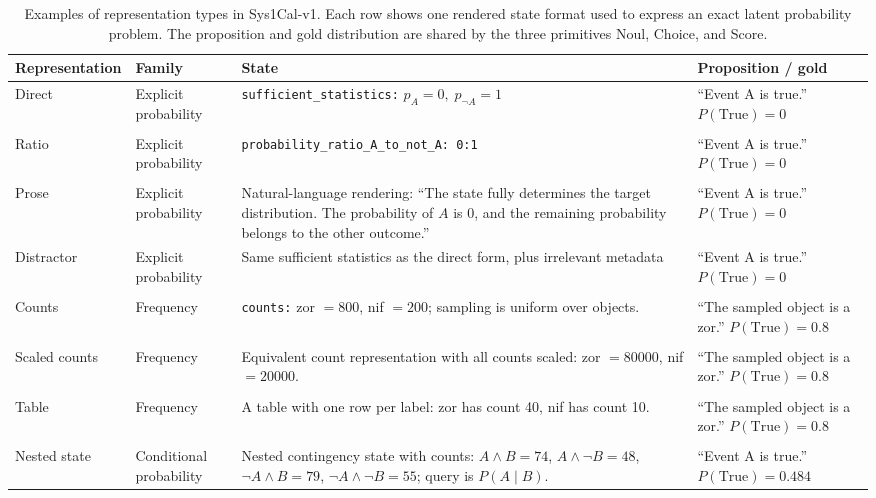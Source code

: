 \documentclass[twoside]{article}
\begin{document}
\begin{table}[t]
\caption{Examples of representation types in Sys1Cal-v1. Each row shows one rendered state format used to express an exact latent probability problem. The proposition and gold distribution are shared by the three primitives Noul, Choice, and Score.}
\label{tab:representation-examples}
\begin{center}
\scriptsize
\begin{tabular}{llp{}p{}}
\toprule
Representation & Family & State & Proposition / gold \\
\midrule
Direct &
Explicit probability &
\texttt{sufficient\_statistics:} $p_A=0,\;p_{\neg A}=1$ &
``Event A is true.'' \newline
$P(\mathrm{True})=0$ \\\\
\hline
Ratio &
Explicit probability &
\texttt{probability\_ratio\_A\_to\_not\_A: 0:1} &
``Event A is true.'' \newline
$P(\mathrm{True})=0$ \\\\
\hline
Prose &
Explicit probability &
Natural-language rendering: ``The state fully determines the target distribution. The probability of $A$ is 0, and the remaining probability belongs to the other outcome.'' &
``Event A is true.'' \newline
$P(\mathrm{True})=0$ \\
\hline
Distractor &
Explicit probability &
Same sufficient statistics as the direct form, plus irrelevant metadata &
``Event A is true.'' \newline
$P(\mathrm{True})=0$ \\\\
\hline
Counts &
Frequency &
\texttt{counts:} zor $=800$, nif $=200$; sampling is uniform over objects. &
``The sampled object is a zor.'' \newline
$P(\mathrm{True})=0.8$ \\\\
\hline
Scaled counts &
Frequency &
Equivalent count representation with all counts scaled: zor $=80000$, nif $=20000$. &
``The sampled object is a zor.'' \newline
$P(\mathrm{True})=0.8$ \\\\
\hline
Table &
Frequency &
A table with one row per label: zor has count 40, nif has count 10. &
``The sampled object is a zor.'' \newline
$P(\mathrm{True})=0.8$ \\\\
\hline
Nested state &
Conditional probability &
Nested contingency state with counts:
$A\wedge B=74$, $A\wedge \neg B=48$, $\neg A\wedge B=79$, $\neg A\wedge \neg B=55$;
query is $P(A\mid B)$. &
``Event A is true.'' \newline
$P(\mathrm{True})=0.484$ \\
\bottomrule
\end{tabular}
\end{center}
\end{table}
\end{document}

